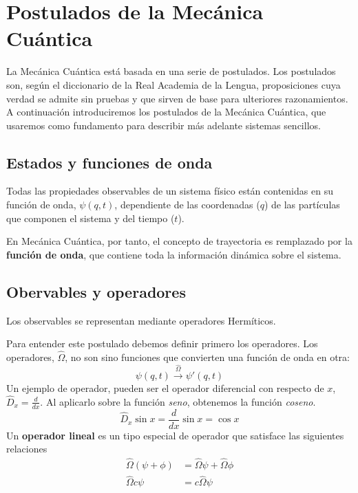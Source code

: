 \chapter{Postulados de la Mecánica Cuántica}
La Mecánica Cuántica está basada en una serie de
postulados. Los postulados son, según el diccionario
de la Real Academia de la Lengua, proposiciones cuya
verdad se admite sin pruebas y que sirven de base para
ulteriores razonamientos. A continuación introduciremos
los postulados de la Mecánica Cuántica, que usaremos 
como fundamento para describir más adelante sistemas
sencillos.

\section*{Estados y funciones de onda}
\begin{theorem}
Todas las propiedades observables de un sistema físico 
están contenidas en su función de onda, $\psi(q,t)$,
dependiente de las coordenadas ($q$) de las
partículas que componen el sistema y del tiempo ($t$). 
\end{theorem}

En Mecánica Cuántica, por tanto, el concepto de 
trayectoria es remplazado por la \textbf{función de
onda}, que contiene toda la información dinámica 
sobre el sistema. 
\section{Obervables y operadores}
\begin{theorem}
Los observables se representan mediante operadores 
Hermíticos.
\end{theorem}
Para entender este postulado debemos definir primero
los operadores. Los operadores, $\hat{\Omega}$, no son
sino funciones que convierten una función de onda 
en otra:
\begin{equation}
    \psi(q,t)\xrightarrow{\hat{\Omega}}\psi'(q,t)
\end{equation}
Un ejemplo de operador, pueden ser el operador
diferencial con respecto de $x$, $\hat{D}_x=\frac{d}{dx}$.
Al aplicarlo sobre la función \textit{seno}, obtenemos
la función \textit{coseno}.
\begin{equation}
    \hat{D}_x\sin x=\frac{d}{dx}\sin x =\cos x
\end{equation}
Un \textbf{operador lineal} es un tipo especial de operador
que satisface las siguientes relaciones
\begin{equation}
      \begin{array}{rl}
        \hat{\Omega}(\psi+\phi) &=\hat{\Omega}\psi + \hat{\Omega}\phi\\
        \hat{\Omega}c\psi &=c\hat{\Omega}\psi
    \end{array}
\end{equation}

